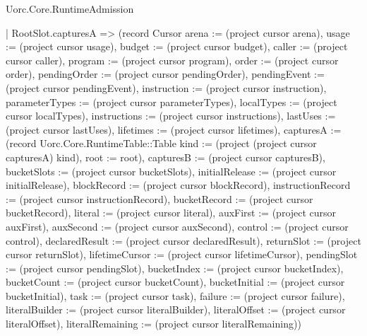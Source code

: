 \begin{lexlean}{Uorc.Core.RuntimeAdmission}
\begin{semanticmodule}
{    | RootSlot.capturesA => (record Cursor {arena := (project cursor arena), usage := (project cursor usage), budget := (project cursor budget), caller := (project cursor caller), program := (project cursor program), order := (project cursor order), pendingOrder := (project cursor pendingOrder), pendingEvent := (project cursor pendingEvent), instruction := (project cursor instruction), parameterTypes := (project cursor parameterTypes), localTypes := (project cursor localTypes), instructions := (project cursor instructions), lastUses := (project cursor lastUses), lifetimes := (project cursor lifetimes), capturesA := (record Uorc.Core.RuntimeTable::Table {kind := (project (project cursor capturesA) kind), root := root}), capturesB := (project cursor capturesB), bucketSlots := (project cursor bucketSlots), initialRelease := (project cursor initialRelease), blockRecord := (project cursor blockRecord), instructionRecord := (project cursor instructionRecord), bucketRecord := (project cursor bucketRecord), literal := (project cursor literal), auxFirst := (project cursor auxFirst), auxSecond := (project cursor auxSecond), control := (project cursor control), declaredResult := (project cursor declaredResult), returnSlot := (project cursor returnSlot), lifetimeCursor := (project cursor lifetimeCursor), pendingSlot := (project cursor pendingSlot), bucketIndex := (project cursor bucketIndex), bucketCount := (project cursor bucketCount), bucketInitial := (project cursor bucketInitial), task := (project cursor task), failure := (project cursor failure), literalBuilder := (project cursor literalBuilder), literalOffset := (project cursor literalOffset), literalRemaining := (project cursor literalRemaining)})
}
\end{semanticmodule}
\end{lexlean}
